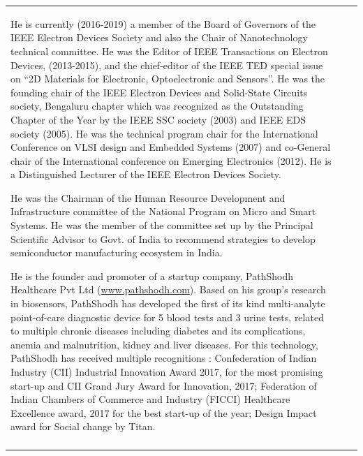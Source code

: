 {\begin{longtable}{V{2.5}p{.95\textwidth}V{2.5}}
\bigskip

He is currently (2016-2019) a member of the Board of Governors of the IEEE Electron Devices Society and also the Chair of Nanotechnology technical committee. He was the Editor of IEEE Transactions on Electron Devices, (2013-2015),  and the chief-editor of the IEEE TED special issue on “2D Materials for Electronic, Optoelectronic and Sensors”. He was the founding chair of the IEEE Electron Devices and Solid-State Circuits society, Bengaluru chapter which was recognized as the Outstanding Chapter of the Year by the IEEE SSC society (2003) and IEEE EDS society (2005). He was the technical program chair for the International Conference on VLSI design and Embedded Systems (2007) and co-General chair of the International conference on Emerging Electronics (2012). He is a Distinguished Lecturer of the IEEE Electron Devices Society. 

\bigskip

He was the Chairman of the Human Resource Development and Infrastructure committee of the National Program on Micro and Smart Systems. He was the member of the committee set up by the Principal Scientific Advisor to Govt. of India to recommend strategies to develop semiconductor manufacturing ecosystem in India.  

\bigskip

He is the founder and promoter of a startup company, PathShodh Healthcare Pvt Ltd (\url{www.pathshodh.com}).   Based on his group’s research in biosensors, PathShodh has developed the first of its kind multi-analyte point-of-care diagnostic device for 5 blood tests and 3 urine tests, related to multiple chronic diseases including diabetes and its complications, anemia and malnutrition, kidney and liver diseases. For this technology, PathShodh has received multiple recognitions : Confederation of Indian Industry (CII) Industrial Innovation Award 2017, for the most promising start-up and CII Grand Jury Award for Innovation, 2017; Federation of Indian Chambers of Commerce and Industry (FICCI) Healthcare Excellence award, 2017 for the best start-up of the year; Design Impact award for Social change by Titan. \\
\end{longtable}}\relax

